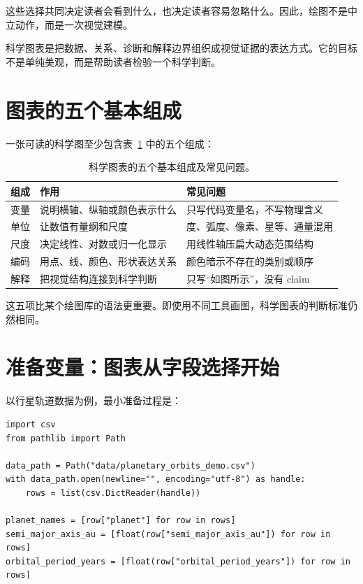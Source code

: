 这些选择共同决定读者会看到什么，也决定读者容易忽略什么。因此，绘图不是中立动作，而是一次视觉建模。

\begin{defbox}[科学图表]
科学图表是把数据、关系、诊断和解释边界组织成视觉证据的表达方式。它的目标不是单纯美观，而是帮助读者检验一个科学判断。
\end{defbox}

\section{图表的五个基本组成}

一张可读的科学图至少包含表~\ref{tab:ch08_figure_components} 中的五个组成：

\begin{table}[htbp]
\centering
\begin{tabular}{p{}p{}p{}}
\toprule
组成 & 作用 & 常见问题 \\
\midrule
变量 & 说明横轴、纵轴或颜色表示什么 & 只写代码变量名，不写物理含义 \\
单位 & 让数值有量纲和尺度 & 度、弧度、像素、星等、通量混用 \\
尺度 & 决定线性、对数或归一化显示 & 用线性轴压扁大动态范围结构 \\
编码 & 用点、线、颜色、形状表达关系 & 颜色暗示不存在的类别或顺序 \\
解释 & 把视觉结构连接到科学判断 & 只写“如图所示”，没有 claim \\
\bottomrule
\end{tabular}
\caption{科学图表的五个基本组成及常见问题。}
\label{tab:ch08_figure_components}
\end{table}

这五项比某个绘图库的语法更重要。即使用不同工具画图，科学图表的判断标准仍然相同。

\section{准备变量：图表从字段选择开始}

以行星轨道数据为例，最小准备过程是：

\begin{examplebox}[读取教学数据并准备变量]
\begin{lstlisting}[style=pythonstyle]
import csv
from pathlib import Path

data_path = Path("data/planetary_orbits_demo.csv")
with data_path.open(newline="", encoding="utf-8") as handle:
    rows = list(csv.DictReader(handle))

planet_names = [row["planet"] for row in rows]
semi_major_axis_au = [float(row["semi_major_axis_au"]) for row in rows]
orbital_period_years = [float(row["orbital_period_years"]) for row in rows]
\end{lstlisting}
\end{examplebox}

